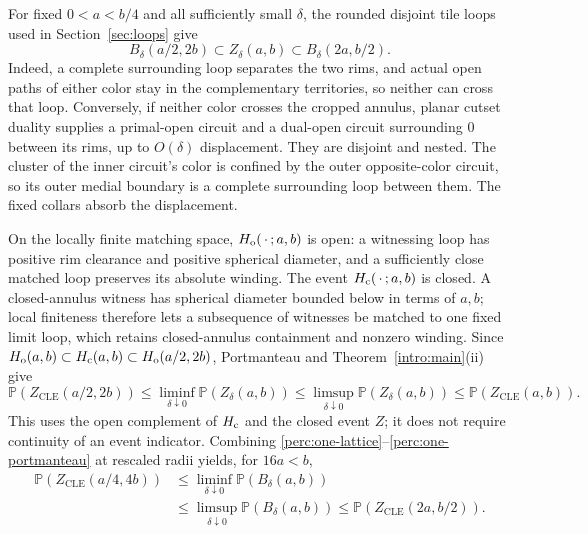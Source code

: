 For fixed $0<a<b/4$ and all sufficiently small $\delta$, the rounded
disjoint tile loops used in Section~\ref{sec:loops} give
\begin{equation}\label{perc:one-lattice}
 B_\delta(a/2,2b)\subset Z_\delta(a,b)
 \subset B_\delta(2a,b/2).
\end{equation}
Indeed, a complete surrounding loop separates the two rims, and actual
open paths of either color stay in the complementary territories, so
neither can cross that loop.  Conversely, if neither color crosses the
cropped annulus, planar cutset duality supplies a primal-open circuit
and a dual-open circuit surrounding $0$ between its rims, up to
$O(\delta)$ displacement.  They are disjoint and nested.  The cluster
of the inner circuit's color is confined by the outer opposite-color
circuit, so its outer medial boundary is a complete surrounding loop
between them.  The fixed collars absorb the displacement.

On the locally finite matching space, $H_{\rm o}(\,\cdot\,;a,b)$ is
open: a witnessing loop has positive rim clearance and positive
spherical diameter, and a sufficiently close matched loop preserves
its absolute winding.  The event $H_{\rm c}(\,\cdot\,;a,b)$ is closed.
A closed-annulus witness has spherical diameter bounded below in terms
of $a,b$; local finiteness therefore lets a subsequence of witnesses
be matched to one fixed limit loop, which retains closed-annulus
containment and nonzero winding.  Since
$H_{\rm o}(a,b)\subset H_{\rm c}(a,b)\subset H_{\rm o}(a/2,2b)$,
Portmanteau and Theorem~\ref{intro:main}(ii) give
\begin{equation}\label{perc:one-portmanteau}
 \mathbb P(Z_{\mathrm{CLE}}(a/2,2b))
 \le \liminf_{\delta\downarrow0}\mathbb P(Z_\delta(a,b))
 \le \limsup_{\delta\downarrow0}\mathbb P(Z_\delta(a,b))
 \le \mathbb P(Z_{\mathrm{CLE}}(a,b)).
\end{equation}
This uses the open complement of $H_{\rm c}$ and the closed event $Z$;
it does not require continuity of an event indicator.  Combining
\eqref{perc:one-lattice}--\eqref{perc:one-portmanteau} at rescaled
radii yields, for $16a<b$,
\begin{equation}\label{perc:either-envelope}
\begin{split}
 \mathbb P(Z_{\mathrm{CLE}}(a/4,4b))
 &\le \liminf_{\delta\downarrow0}\mathbb P(B_\delta(a,b))\\
 &\le \limsup_{\delta\downarrow0}\mathbb P(B_\delta(a,b))
 \le \mathbb P(Z_{\mathrm{CLE}}(2a,b/2)).
\end{split}
\end{equation}

